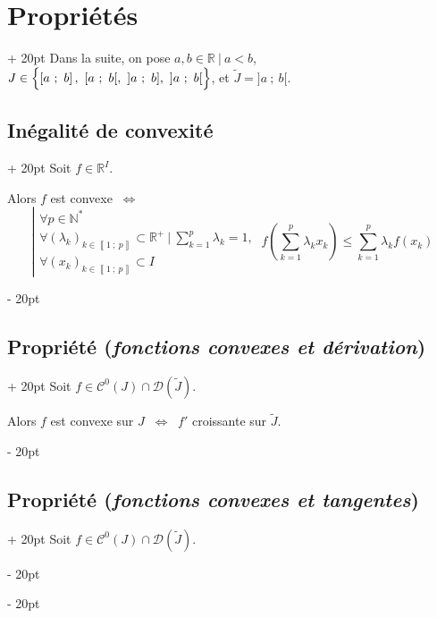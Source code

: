 \documentclass[a4paper, 12pt, twoside]{article}
\newcommand{\N}{\mathbb{N}} %
\newcommand{\R}{\mathbb{R}} %
\newcommand{\seg}[2]{\left[ #1\ ;\ #2 \right]}
\newcommand{\nset}[2]{\left\llbracket #1\ ;\ #2 \right\rrbracket}
\newcommand{\lr}[1]{\left( #1 \right)}
\newcommand{\set}[1]{\left\{ #1 \right\}}
\newcommand{\ssi}{\ \Leftrightarrow \ }
\renewcommand{\le}{\leqslant}
\newcommand{\ind}[1][20pt]{\advance\leftskip + #1}
\newcommand{\deind}[1][20pt]{\advance\leftskip - #1}
\newenvironment{indt}[2][20pt]{#2 \par \ind[#1]}{\par \deind} %
\begin{document}
    \begin{indt}{\section{Propriétés}}
        Dans la suite, on pose $a, b \in \R\ |\ a < b$, $J \in \set{\seg a b,\ [a\ ;\ b[,\ ]a\ ;\ b],\ ]a\ ;\ b[ \vphantom{\dfrac a a}}$, et $\widetilde J = ]a\ ;\ b[$.

        \begin{indt}{\subsection{Inégalité de convexité}}
            Soit $f \in \R^I$.

            Alors $f$ est convexe $\ssi$
            \[
                \left|
                \begin{array}{l}
                    \forall p \in \N^*
                    \\
                    \displaystyle \forall (\lambda_k)_{k \in \nset 1 p} \subset \R^+\ |\ \sum_{k = 1}^p \lambda_k = 1,
                    \\
                    \forall (x_k)_{k \in \nset 1 p} \subset I
                \end{array}
                \right.\
                f\!\lr{\sum_{k = 1}^p \lambda_k x_k} \le \sum_{k = 1}^p \lambda_k f(x_k)
            \]
        \end{indt}

        \vspace{12pt}
        
        \begin{indt}{\subsection{Propriété (\textit{fonctions convexes et dérivation})}}
            Soit $f \in \mathcal C^0(J) \cap \mathcal D\!\lr{\widetilde J}$.

            \vspace{6pt}
            
            Alors $f$ est convexe sur $J$ $\ssi$ $f'$ croissante sur $\widetilde J$.
        \end{indt}

        \vspace{12pt}
        
        \begin{indt}{\subsection{Propriété (\textit{fonctions convexes et tangentes})}}
            Soit $f \in \mathcal C^0(J) \cap \mathcal D\!\lr{\widetilde J}$.


\end{indt}
\end{indt}
\end{document}
